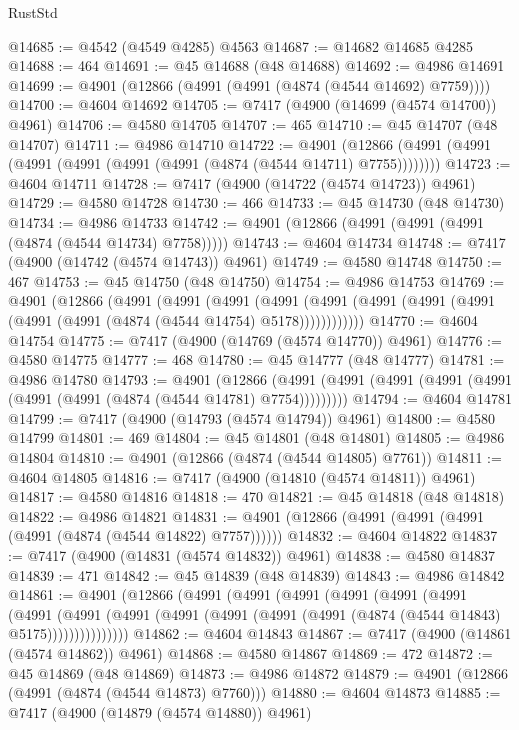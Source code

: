 \begin{lexlean}{RustStd}
\begin{coremodule}
@14685 := @4542 (@4549 @4285) @4563
@14687 := @14682 @14685 @4285
@14688 := 464
@14691 := @45 @14688 (@48 @14688)
@14692 := @4986 @14691
@14699 := @4901 (@12866 (@4991 (@4991 (@4874 (@4544 @14692) @7759))))
@14700 := @4604 @14692
@14705 := @7417 (@4900 (@14699 (@4574 @14700)) @4961)
@14706 := @4580 @14705
@14707 := 465
@14710 := @45 @14707 (@48 @14707)
@14711 := @4986 @14710
@14722 := @4901
    (@12866 (@4991 (@4991 (@4991 (@4991 (@4991 (@4991 (@4874 (@4544 @14711) @7755))))))))
@14723 := @4604 @14711
@14728 := @7417 (@4900 (@14722 (@4574 @14723)) @4961)
@14729 := @4580 @14728
@14730 := 466
@14733 := @45 @14730 (@48 @14730)
@14734 := @4986 @14733
@14742 := @4901 (@12866 (@4991 (@4991 (@4991 (@4874 (@4544 @14734) @7758)))))
@14743 := @4604 @14734
@14748 := @7417 (@4900 (@14742 (@4574 @14743)) @4961)
@14749 := @4580 @14748
@14750 := 467
@14753 := @45 @14750 (@48 @14750)
@14754 := @4986 @14753
@14769 := @4901
    (@12866
      (@4991
        (@4991
          (@4991
            (@4991 (@4991 (@4991 (@4991 (@4991 (@4991 (@4991 (@4874 (@4544 @14754) @5178))))))))))))
@14770 := @4604 @14754
@14775 := @7417 (@4900 (@14769 (@4574 @14770)) @4961)
@14776 := @4580 @14775
@14777 := 468
@14780 := @45 @14777 (@48 @14777)
@14781 := @4986 @14780
@14793 := @4901
    (@12866 (@4991 (@4991 (@4991 (@4991 (@4991 (@4991 (@4991 (@4874 (@4544 @14781) @7754)))))))))
@14794 := @4604 @14781
@14799 := @7417 (@4900 (@14793 (@4574 @14794)) @4961)
@14800 := @4580 @14799
@14801 := 469
@14804 := @45 @14801 (@48 @14801)
@14805 := @4986 @14804
@14810 := @4901 (@12866 (@4874 (@4544 @14805) @7761))
@14811 := @4604 @14805
@14816 := @7417 (@4900 (@14810 (@4574 @14811)) @4961)
@14817 := @4580 @14816
@14818 := 470
@14821 := @45 @14818 (@48 @14818)
@14822 := @4986 @14821
@14831 := @4901 (@12866 (@4991 (@4991 (@4991 (@4991 (@4874 (@4544 @14822) @7757))))))
@14832 := @4604 @14822
@14837 := @7417 (@4900 (@14831 (@4574 @14832)) @4961)
@14838 := @4580 @14837
@14839 := 471
@14842 := @45 @14839 (@48 @14839)
@14843 := @4986 @14842
@14861 := @4901
    (@12866
      (@4991
        (@4991
          (@4991
            (@4991
              (@4991
                (@4991
                  (@4991
                    (@4991
                      (@4991 (@4991 (@4991 (@4991 (@4991 (@4874 (@4544 @14843) @5175)))))))))))))))
@14862 := @4604 @14843
@14867 := @7417 (@4900 (@14861 (@4574 @14862)) @4961)
@14868 := @4580 @14867
@14869 := 472
@14872 := @45 @14869 (@48 @14869)
@14873 := @4986 @14872
@14879 := @4901 (@12866 (@4991 (@4874 (@4544 @14873) @7760)))
@14880 := @4604 @14873
@14885 := @7417 (@4900 (@14879 (@4574 @14880)) @4961)

\end{coremodule}
\end{lexlean}
